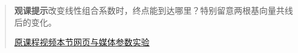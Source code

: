 \begin{quote}\small\textbf{观课提示}\quad 改变线性组合系数时，终点能到达哪里？特别留意两根基向量共线后的变化。

\href{https://www.youtube.com/watch?v=k7RM-ot2NWY}{原课程视频}\quad\href{https://vitael04213.github.io/3blue1brown-notes/lessons/span.html}{本节网页与媒体}\quad\href{https://vitael04213.github.io/3blue1brown-notes/lab.html\#vectors}{参数实验}
\end{quote}
